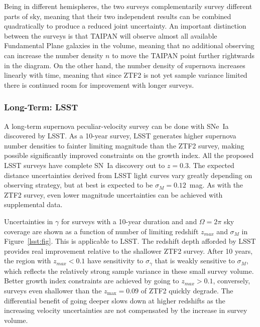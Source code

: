 \documentclass[11pt, oneside]{article}   	%
\begin{document}
Being in different hemispheres, the two surveys
complementarily survey different parts of sky, meaning that their two independent results can be
combined  quadratically to produce a reduced joint uncertainty.  An important distinction between the surveys is
that TAIPAN will observe almost all available Fundamental Plane galaxies in the volume, meaning that no additional observing can
increase the number density $n$ to
move the TAIPAN point further rightwards in the diagram.  On the other hand, the number density of supernova increases
linearly with time, meaning that since ZTF2 is not yet sample variance limited there is continued room for improvement with longer surveys.

\subsubsection{Long-Term: LSST}
A long-term supernova peculiar-velocity survey can be done with SNe~Ia discovered by LSST.
As a 10-year survey, LSST generates higher supernova number densities to fainter limiting magnitude than the ZTF2 survey,
making possible significantly improved constraints on the growth index.
All the proposed LSST surveys have complete SN~Ia discovery out to $z=0.3$.
The expected distance uncertainties derived from LSST light curves vary greatly depending on observing strategy, but at best
is expected to be $\sigma_M=0.12$~mag.    As with the ZTF2 survey, even lower magnitude uncertainties
can be achieved with supplemental data.

Uncertainties in $\gamma$ for surveys with a 10-year duration and  and $\Omega=2\pi$ sky coverage 
are shown as a function of number of limiting  redshift $z_{max}$ and $\sigma_M$ in Figure~\ref{lsst:fig}.
This is applicable to LSST.
The redshift depth afforded by LSST provides real improvement relative to the shallower ZTF2 survey.
After 10 years, the region with $z_{max}<0.1$ have sensitivity to  $\sigma_\gamma$ that is weakly sensitive to $\sigma_M$, 
which reflects the relatively strong sample variance in these small survey volume.  Better growth index constraints
are achieved by going to $z_{max}>0.1$, conversely, surveys even shallower than the $z_{\text{max}}=0.09$ 
of ZTF2 quickly degrade.
The differential benefit of going deeper slows down at higher redshifts as the increasing velocity uncertainties are not compensated by
the increase in survey volume. 
\end{document}
